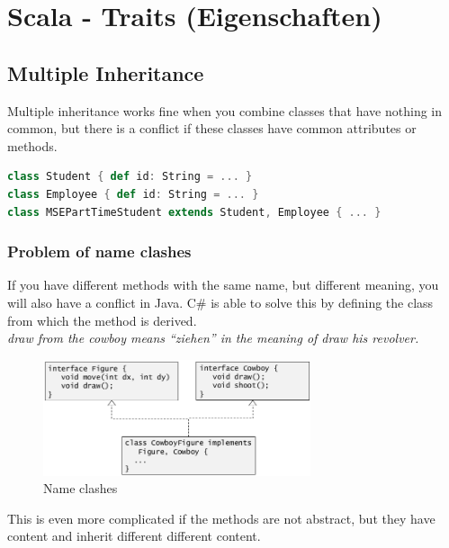\hypertarget{scala-traits-eigenschaften}{%
\section{Scala - Traits (Eigenschaften)}\label{scala-traits-eigenschaften}}

\hypertarget{multiple-inheritance}{%
\subsection{Multiple Inheritance}\label{multiple-inheritance}}

Multiple inheritance works fine when you combine classes that have
nothing in common, but there is a conflict if these classes have common
attributes or methods.

\begin{lstlisting}[language=scala,mathescape=false]
class Student { def id: String = ... }
class Employee { def id: String = ... }
class MSEPartTimeStudent extends Student, Employee { ... }
\end{lstlisting}

\hypertarget{problem-of-name-clashes}{%
\subsubsection{Problem of name clashes}\label{problem-of-name-clashes}}

If you have different methods with the same name, but different meaning,
you will also have a conflict in Java. C\# is able to solve this by
defining the class from which the method is derived.\\
\textit{draw from the cowboy means ``ziehen'' in the meaning of draw his
revolver.}

\begin{figure}[H]
\centering
\includegraphics[width=0.7\textwidth]{figures/nameClash.png}
\caption{Name clashes}
\end{figure}

This is even more complicated if the methods are not abstract, but they
have content and inherit different different content.

